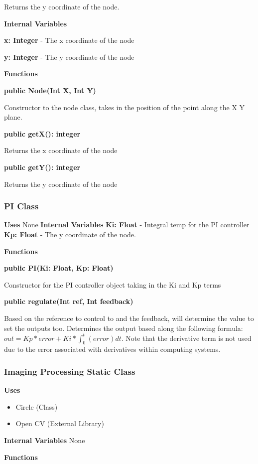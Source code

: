 \documentclass [10pt]{article}
\begin{document}
Returns the y coordinate of the node.

\textbf{Internal Variables}

\textbf{x: Integer} - The x coordinate of the node

\textbf{y: Integer} - The y coordinate of the node

\textbf{Functions}

\textbf{public Node(Int X, Int Y)}

Constructor to the node class, takes in the position of the point along the X Y plane.

\textbf{public getX(): integer}

Returns the x coordinate of the node

\textbf{public getY(): integer}

Returns the y coordinate of the node


\subsubsection{PI Class}
\textbf{Uses}
None 
\textbf{Internal Variables}
\textbf{Ki: Float} - Integral temp for the PI controller
\textbf{Kp: Float} - The y coordinate of the node.

\textbf{Functions}

\textbf{public PI(Ki: Float, Kp: Float)}

Constructor for the PI controller object taking in the Ki and Kp terms

\textbf{public regulate(Int ref, Int feedback)}

Based on the reference to control to and the feedback, will determine the value to set the outputs too. Determines the output based along the following formula: $ out = Kp*error+Ki*\int_{0}^{t}(error)dt$. Note that the derivative term is not used due to the error associated with derivatives within computing systems.


\subsubsection{Imaging Processing Static Class}
\textbf{Uses}
\begin{itemize}
	\item Circle (Class)
	\item Open CV (External Library)
\end{itemize}


\textbf{Internal Variables}
None

\textbf{Functions}
\end{document}
